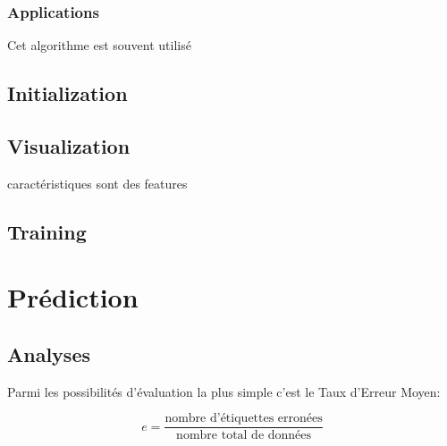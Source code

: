 \documentclass{article}
\begin{document}
\subsubsection{Applications}
Cet algorithme est souvent utilisé 


\subsection{Initialization}
\subsection{Visualization}
caractéristiques sont des features
\subsection{Training}



\section{Prédiction}
\subsection{Analyses}
Parmi les possibilités d'évaluation la plus simple c'est le Taux d'Erreur Moyen:
\begin{definition}
    \begin{equation}
        \boxed{
            e = \frac{\text{nombre d'étiquettes erronées}}{\text{nombre total de données}}
        }
    \end{equation}
\end{definition}
\end{document}
